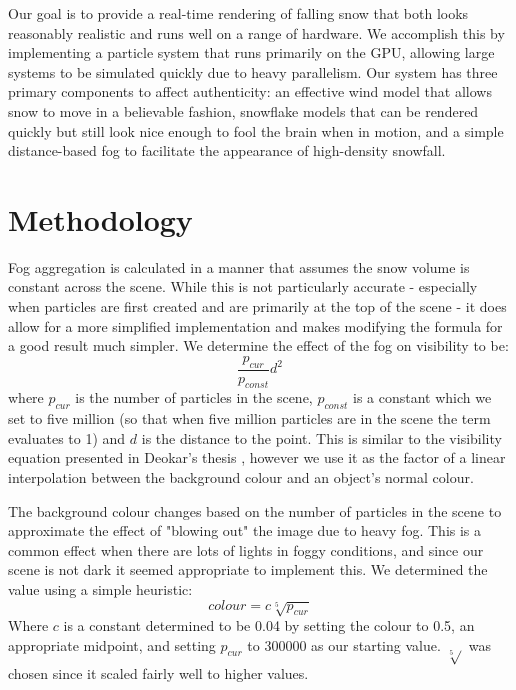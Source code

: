 \documentclass[conference]{acmsiggraph}
\begin{document}
Our goal is to provide a real-time rendering of falling snow that both looks reasonably realistic and runs well on a range of hardware. We accomplish this by implementing a particle system that runs primarily on the GPU, allowing large systems to be simulated quickly due to heavy parallelism. Our system has three primary components to affect authenticity: an effective wind model that allows snow to move in a believable fashion, snowflake models that can be rendered quickly but still look nice enough to fool the brain when in motion, and a simple distance-based fog to facilitate the appearance of high-density snowfall.

\section{Methodology}
Fog aggregation is calculated in a manner that assumes the snow volume is constant across the scene. While this is not particularly accurate - especially when particles are first created and are primarily at the top of the scene - it does allow for a more simplified implementation and makes modifying the formula for a good result much simpler. We determine the effect of the fog on visibility to be:
\begin{equation} \label{eq:fog}
\frac{p_{cur}}{p_{const}}d^2
\end{equation}
where $p_{cur}$ is the number of particles in the scene, $p_{const}$ is a constant which we set to five million (so that when five million particles are in the scene the term evaluates to 1) and $d$ is the distance to the point. This is similar to the visibility equation presented in Deokar's thesis \cite{deokar09}, however we use it as the factor of a linear interpolation between the background colour and an object's normal colour.

The background colour changes based on the number of particles in the scene to approximate the effect of "blowing out" the image due to heavy fog. This is a common effect when there are lots of lights in foggy conditions, and since our scene is not dark it seemed appropriate to implement this. We determined the value using a simple heuristic:
\begin{equation} \label{eq:bgcolour}
colour = c\sqrt[5]{p_{cur}}
\end{equation}
Where $c$ is a constant determined to be 0.04 by setting the colour to 0.5, an appropriate midpoint, and setting $p_{cur}$ to 300000 as our starting value. $\sqrt[5]{}$ was chosen since it scaled fairly well to higher values.
\end{document}
